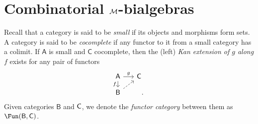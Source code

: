 \section{Combinatorial $\mathcal{M}$-bialgebras}

Recall that a category is said to be \textit{small} if its objects and morphisms form sets. A category is said to be \textit{cocomplete} if any functor to it from a small category has a colimit.
If $\mathsf{A}$ is small and $\mathsf{C}$ cocomplete, then the (left) \textit{Kan extension of $g$ along $f$} exists for any pair of functors
\begin{equation*}
\begin{tikzcd}[column sep=small, row sep=small]
\mathsf{A} \arrow[d, "f"'] \arrow[r, "g"] & \mathsf{C} \\ 
\mathsf{B} \arrow[dashed, ur] & \quad .
\end{tikzcd}
\end{equation*}
Given categories $\mathsf{B}$ and $\mathsf{C}$, we denote the \textit{functor category} between them as $\Fun(\mathsf{B}, \C)$.


